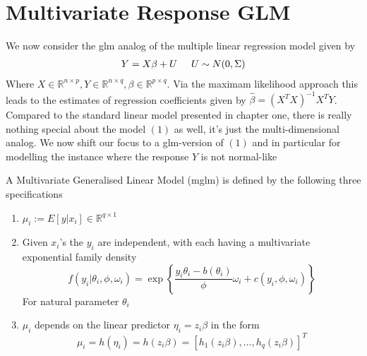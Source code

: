 
\section{Multivariate Response GLM}

We now consider the glm analog of the multiple linear regression model given by 
\begin{align}
    Y = X\beta + U \hspace{5mm} U \sim N(0, \Sigma)
\end{align}
Where $X\in\mathbb{R}^{n\times p}, Y\in\mathbb{R}^{n\times q}, \beta\in\mathbb{R}^{p\times q}$. Via the maximam likelihood approach this leads to the estimates of regression coefficients given by $\hat{\beta} = (X^T X)^{-1}X^TY$. Compared to the standard linear model presented in chapter one, there is really nothing special about the model $(1)$ as well, it's just the multi-dimensional analog. We now shift our focus to a glm-version of $(1)$ and in particular for modelling the instance where the response $Y$ is not normal-like

\begin{definition}
    A Multivariate Generalised Linear Model (mglm) is defined by the following three specifications 
    \begin{enumerate}
        \item $\mu_i := E[y | x_i] \in\mathbb{R}^{q\times 1}$ 
        \item Given $x_i$'s the $y_i$ are independent, with each having a multivariate exponential family density
        $$f(y_i | \theta_i, \phi,\omega_i) = \exp\left\{\frac{y_i\theta_i - b(\theta_i)}{\phi}\omega_i + c(y_i,\phi,\omega_i)\right\}$$
        For natural parameter $\theta_i$
        \item $\mu_i$ depends on the linear predictor $\eta_i = z_i\beta$ in the form 
        $$\mu_i = h(\eta_i) = h(z_i\beta) = [h_1(z_i\beta),\dots,h_q(z_i\beta)]^T$$
    \end{enumerate}
\end{definition}



